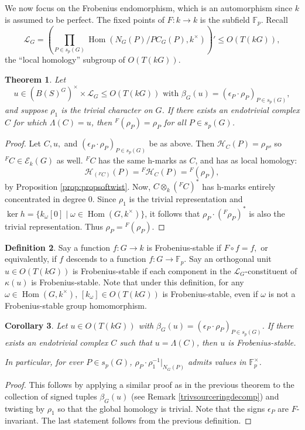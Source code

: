 \documentclass[10pt,letterpaper, boxed, cm]{amsart}
\newcommand{\Hom}{\operatorname{Hom}}
\newcommand{\inv}{^{-1}}
\newcommand{\calE}{\mathcal{E}}
\newcommand{\calH}{\mathcal{H}}
\newcommand{\calL}{\mathcal{L}}
\newtheorem{theorem}{Theorem}[section]
\newtheorem{corollary}[theorem]{Corollary}
\theoremstyle{remark}
\theoremstyle{definition}
\newtheorem{definition}[theorem]{Definition}
\begin{document}
	We now focus on the Frobenius endomorphism, which is an automorphism since $k$ is assumed to be perfect. The fixed points of $F:k\to k$ is the subfield $\mathbb{F}_p$. Recall \[\calL_G = \left(\prod_{P\in s_p(G)} \Hom(N_G(P)/PC_G(P), k^\times)\right)'\leq O(T(kG)),\] the ``local homology'' subgroup of $O(T(kG))$.

	\begin{theorem}
		Let \[ u \in (B(S)^G)^\times \times \calL_G \leq O(T(kG)) \text{  with  } \beta_G(u) = (\epsilon_P \cdot \rho_P)_{P\in s_p(G)},\] and suppose $\rho_1$ is the trivial character on $G$. If there exists an endotrivial complex $C$ for which $\Lambda(C) = u$, then $^F(\rho_P) = \rho_P$ for all $P\in s_p(G)$.
	\end{theorem}
	\begin{proof}
		Let $C, u,$ and $(\epsilon_P \cdot \rho_P)_{P\in s_p(G)}$ be as above. Then $\calH_C(P) = \rho_P$, so ${}^FC \in \calE_k(G)$ as well. ${}^FC$ has the same h-marks as $C$, and has as local homology: \[\calH_{({}^FC)}(P) =  {}^F\calH_C(P) = {}^F(\rho_P),\] by Proposition \ref{prop:propsoftwist}. Now, $C\otimes_k ({}^FC)^*$ has h-marks entirely concentrated in degree 0. Since $\rho_1$ is the trivial representation and $\ker h = \{k_\omega[0] \mid \omega \in \Hom(G,k^\times)\}$, it follows that $\rho_P \cdot ({}^F\rho_P)^* $ is also the trivial representation. Thus $\rho_P = {}^F(\rho_P)$.
	\end{proof}

    \begin{definition}
        Say a function $f: G \to k$ is Frobenius-stable if $F\circ f = f,$ or equivalently, if $f$ descends to a function $f: G\to \mathbb{F}_p$. Say an orthogonal unit $u \in O(T(kG))$ is Frobenius-stable if each component in the $\calL_G$-constituent of $\kappa(u)$ is Frobenius-stable. Note that under this definition, for any $\omega \in \Hom(G,k^\times)$, $[k_\omega] \in O(T(kG))$ is Frobenius-stable, even if $\omega$ is not a Frobenius-stable group homomorphism.

    \end{definition}


	\begin{corollary}
		Let $u \in O(T(kG))$ with $\beta_G(u) = (\epsilon_P \cdot \rho_P)_{P \in s_p(G)}$. If there exists an endotrivial complex $C$ such that $u = \Lambda(C)$, then $u$ is Frobenius-stable.

		In particular, for ever $P \in s_p(G)$, $\rho_P \cdot \rho_1\inv|_{N_G(P)}$ admits values in $\mathbb{F}_p^\times$.
	\end{corollary}
	\begin{proof}
		This follows by applying a similar proof as in the previous theorem to the collection of signed tuples $\beta_G(u)$ (see Remark \ref{trivsourceringdecomp}) and twisting by $\rho_1$ so that the global homology is trivial. Note that the signs $\epsilon_P$ are $F$-invariant. The last statement follows from the previous definition.
	\end{proof}
\end{document}
